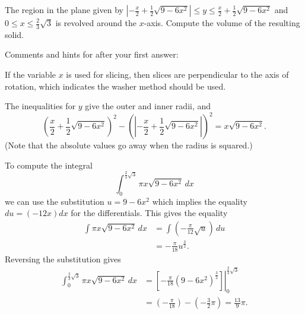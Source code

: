 \documentclass{ximera}
\begin{document}
\begin{question}%

The region in the plane given by \(\left|{- \frac{x}{2} + \frac{1}{2} \sqrt{9 - 6 x^{2}}}\right| \leq y \leq \frac{x}{2} + \frac{1}{2} \sqrt{9 - 6 x^{2}}\) and \(0 \leq x \leq \frac{2}{3} \sqrt{3}\) is revolved around the \(x\)-axis. Compute the volume of the resulting solid.
\begin{multiplechoice}
\end{multiplechoice}
Comments and hints for after your first answer:
\begin{feedback}
If the variable \(x\) is used for slicing, then slices are perpendicular to the axis of rotation, which indicates the washer method should be used.
\begin{hint}
The inequalities for \(y\) give the outer and inner radii, and \[ \left(\frac{x}{2} + \frac{1}{2} \sqrt{9 - 6 x^{2}}\right)^2 - \left( \left|{- \frac{x}{2} + \frac{1}{2} \sqrt{9 - 6 x^{2}}}\right|\right)^2 = x \sqrt{9 - 6 x^{2}}. \](Note that the absolute values go away when the radius is squared.)
\begin{hint}
To compute the integral 
\[ \int_{0}^{\frac{2}{3} \sqrt{3}} \pi x \sqrt{9 - 6 x^{2}}\, dx \]
 we can use the substitution \(u = 9 - 6 x^{2}\) which implies the equality \(du = \left(- 12 x\right)dx\) for the differentials. This gives the equality
\[ \begin{aligned} \int \pi x \sqrt{9 - 6 x^{2}}\, dx & = \int \left(- \frac{\pi}{12} \sqrt{u}\right)\, du \\
 & = - \frac{\pi}{18} u^{\frac{3}{2}}. \end{aligned} \]
Reversing the substitution gives
\[ \begin{aligned} \int_{0}^{\frac{2}{3} \sqrt{3}} \pi x \sqrt{9 - 6 x^{2}}\, dx & = \left. \left[- \frac{\pi}{18} \left(9 - 6 x^{2}\right)^{\frac{3}{2}} \right] \right|_{0}^{\frac{2}{3} \sqrt{3}}\\ & = \left(- \frac{\pi}{18} \right) - \left(- \frac{3}{2} \pi \right) = \frac{13}{9} \pi. \end{aligned} \]
\end{hint}
\end{hint}
\end{feedback}

\end{question}
\end{document}
